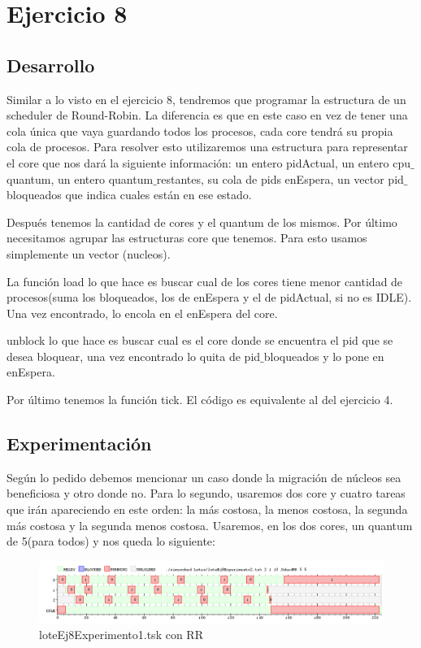 \section{Ejercicio 8}


\subsection{Desarrollo}
Similar  a lo visto en el ejercicio 8, tendremos que programar la estructura de un scheduler de Round-Robin. La diferencia es que en este caso en vez de tener una cola única 
que vaya guardando todos los procesos, cada core tendrá su propia cola de procesos. Para resolver esto utilizaremos una estructura para representar el core que nos dará la 
siguiente información: un entero pidActual, un entero cpu$\_$quantum, un entero quantum$\_$restantes, su cola de pids enEspera, un vector pid$\_$bloqueados que indica cuales están en ese estado.

Después tenemos la cantidad de cores y el quantum de los mismos. Por último necesitamos agrupar las estructuras core que tenemos. Para esto usamos simplemente un vector 
(nucleos).

La función load lo que hace es buscar cual de los cores tiene menor cantidad de procesos(suma los bloqueados, los de enEspera y el de pidActual, si no es IDLE). Una vez 
encontrado, lo encola en el enEspera del core.

unblock lo que hace es buscar cual es el core donde se encuentra el pid que se desea bloquear, una vez encontrado lo quita de pid$\_$bloqueados y lo pone en enEspera.

Por último tenemos la función tick. El código es equivalente al del ejercicio 4.


\subsection{Experimentación}
Según lo pedido debemos mencionar un caso donde la migración de núcleos sea beneficiosa y otro donde no. Para lo segundo, usaremos dos core y cuatro tareas que irán apareciendo
en este orden: la más costosa,  la menos costosa, la segunda más costosa y la segunda menos costosa. Usaremos, en los dos cores, un quantum de 5(para todos) y nos queda lo siguiente:

\begin{figure}[H]
  \centering
    \includegraphics[width=1.1\textwidth]{imagenes/Ej8Experimento3.png}
  \caption{loteEj8Experimento1.tsk con RR}
\end{figure}

